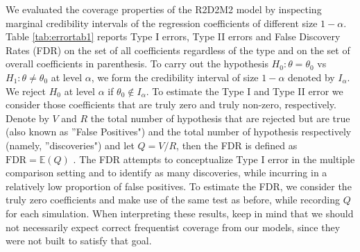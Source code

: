 We evaluated the coverage properties of the R2D2M2 model by inspecting marginal credibility intervals of the regression coefficients of different size $1-\alpha$. Table \ref{tab:errortab1} reports Type I errors, Type II errors and False Discovery Rates (FDR) on the set of all coefficients regardless of the type and on the set of overall coefficients in parenthesis. To carry out the hypothesis $H_0: \theta= \theta_0$ vs $H_1: \theta \neq \theta_0$ at level $\alpha$, we form the credibility interval of size $1-\alpha$ denoted by $I_\alpha$. We reject $H_0$ at level $\alpha$ if $\theta_0 \not\in I_\alpha$. To estimate the Type I and Type II error we consider those coefficients that are truly zero and truly non-zero, respectively. Denote by $V$ and $R$ the total number of hypothesis that are rejected but are true (also known as ''False Positives") and the total number of hypothesis respectively (namely, ''discoveries") and let $Q=V/R$, then the FDR is defined as $\text{FDR}=\mathbb{E}(Q)$ \citep{FDRBenjamini}. The FDR attempts to conceptualize Type I error in the multiple comparison setting and to identify as many discoveries, while incurring in a relatively low proportion of false positives. To estimate the FDR, we consider the truly zero coefficients and make use of the same test as before, while recording $Q$ for each simulation. When interpreting these results, keep in mind that we should not necessarily expect correct frequentist coverage from our models, since they were not built to satisfy that goal.

